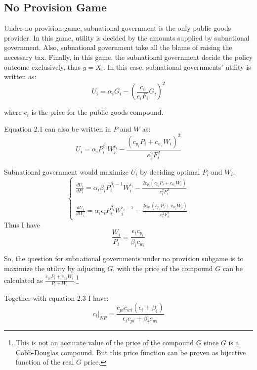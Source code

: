 \begin{itemize}
\subsection{No Provision Game}
Under no provision game, subnational government is the only public goods provider. In this game, utility is decided by the amounts supplied by subnational government. Also, subnational government take all the blame of raising the necessary tax. Finally, in this game, the subnational government decide the policy outcome exclusively, thus $y=X_i$. In this case, subnational governments' utility is written as:
\begin{equation}
    U_i=\alpha_i G_i-\left(\frac{c_i}{e_i F_i} G_i\right)^2
\end{equation}

where $c_i$ is the price for the public goods compound.

Equation 2.1 can also be written in $P$ and $W$ as:
\begin{equation}
    U_i=\alpha_i P_i^{\beta_i}W_i^{\epsilon_i}-\frac{(c_{p_i}P_i+c_{w_i}W_i)^2}{e_i^2 F_i^2}
\end{equation}


Subnational government would maximize $U_i$ by deciding optimal $P_i$ and $W_i$.
$$
    \left\{\begin{array}{l}
        \frac{dU_i}{dP_i}= \alpha_i \beta_i P_i^{\beta_i-1}W_i^{\epsilon_i}-\frac{2 c_{p_i}(c_{p_i}P_i+c_{w_i}W_i)}{e_i^2 F_i^2} \\ \\

        \frac{dU_i}{dW_i}=  \alpha_i \epsilon_i P_i^{\beta_i}W_i^{\epsilon_i-1}-\frac{2 c_{w_i}(c_{p_i}P_i+c_{w_i}W_i)}{e_i^2 F_i^2}\end{array}\right.
$$
Thus I have
\begin{equation}
    \frac{W_i}{P_i}=\frac{\epsilon_i c_{p_i}}{\beta_ic_{w_i}}
\end{equation}

So, the question for subnational governments under no provision subgame is to maximize the utility by adjusting $G$, with the price of the compound $G$ can be calculated as $\frac{c_{pi}P_i+c_{wi}W_i}{P_i+W_i}$.\footnote{This is not an accurate value of the price of the compound $G$ since $G$ is a Cobb-Douglas compound. But this price function can be proven as bijective function of the real $G$ price.}

Together with equation 2.3 I have:
\begin{equation}
    c_i|_{NP}=\frac{c_{pi}c_{wi}(\epsilon_i+\beta_i)}{\epsilon_ic_{pi}+\beta_i c_{wi}}
\end{equation}


\end{itemize}
